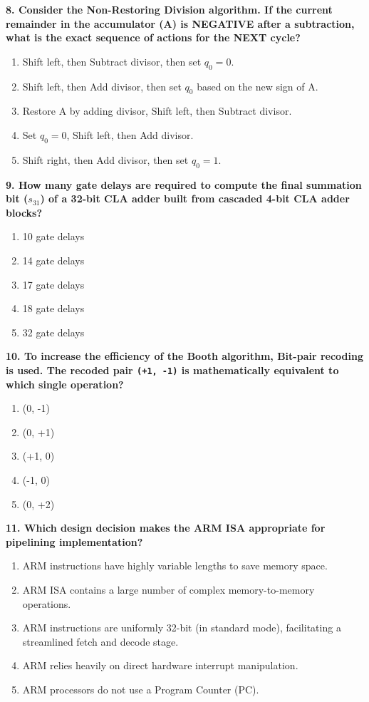 \documentclass[12pt]{article}
\begin{document}
\textbf{8. Consider the Non-Restoring Division algorithm. If the current remainder in the accumulator (A) is NEGATIVE after a subtraction, what is the exact sequence of actions for the NEXT cycle?}
\begin{enumerate}[label=\Alph*.]
    \item Shift left, then Subtract divisor, then set $q_0 = 0$.
    \item Shift left, then Add divisor, then set $q_0$ based on the new sign of A.
    \item Restore A by adding divisor, Shift left, then Subtract divisor.
    \item Set $q_0 = 0$, Shift left, then Add divisor.
    \item Shift right, then Add divisor, then set $q_0 = 1$.
\end{enumerate}

\textbf{9. How many gate delays are required to compute the final summation bit ($s_{31}$) of a 32-bit CLA adder built from cascaded 4-bit CLA adder blocks?}
\begin{enumerate}[label=\Alph*.]
    \item 10 gate delays
    \item 14 gate delays
    \item 17 gate delays
    \item 18 gate delays
    \item 32 gate delays
\end{enumerate}

\textbf{10. To increase the efficiency of the Booth algorithm, Bit-pair recoding is used. The recoded pair \texttt{(+1, -1)} is mathematically equivalent to which single operation?}
\begin{enumerate}[label=\Alph*.]
    \item (0, -1)
    \item (0, +1)
    \item (+1, 0)
    \item (-1, 0)
    \item (0, +2)
\end{enumerate}

\textbf{11. Which design decision makes the ARM ISA appropriate for pipelining implementation?}
\begin{enumerate}[label=\Alph*.]
    \item ARM instructions have highly variable lengths to save memory space.
    \item ARM ISA contains a large number of complex memory-to-memory operations.
    \item ARM instructions are uniformly 32-bit (in standard mode), facilitating a streamlined fetch and decode stage.
    \item ARM relies heavily on direct hardware interrupt manipulation.
    \item ARM processors do not use a Program Counter (PC).
\end{enumerate}
\end{document}
